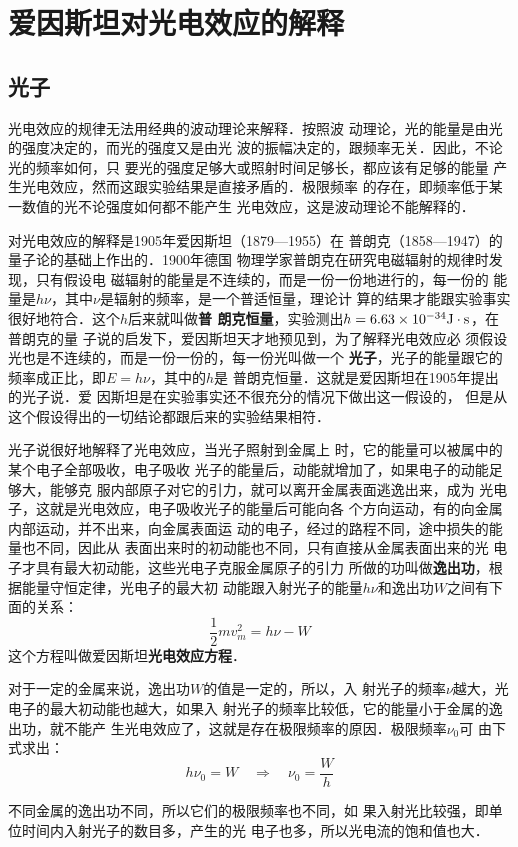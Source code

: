 \section{爱因斯坦对光电效应的解释}
\subsection{光子}
光电效应的规律无法用经典的波动理论来解释．按照波
动理论，光的能量是由光的强度决定的，而光的强度又是由光
波的振幅决定的，跟频率无关．因此，不论光的频率如何，只
要光的强度足够大或照射时间足够长，都应该有足够的能量
产生光电效应，然而这跟实验结果是直接矛盾的．极限频率
的存在，即频率低于某一数值的光不论强度如何都不能产生
光电效应，这是波动理论不能解释的．

对光电效应的解释是1905年爱因斯坦（1879—1955）在
普朗克（1858—1947）的量子论的基础上作出的．1900年德国
物理学家普朗克在研究电磁辐射的规律时发现，只有假设电
磁辐射的能量是不连续的，而是一份一份地进行的，每一份的
能量是$h\nu$，其中$\nu$是辐射的频率，是一个普适恒量，理论计
算的结果才能跟实验事实很好地符合．这个$h$后来就叫做\textbf{普
朗克恒量}，实验测出$h=6.63\times10^{-34}{\rm J}\cdot {\rm s}$，在普朗克的量
子说的启发下，爱因斯坦天才地预见到，为了解释光电效应必
须假设光也是不连续的，而是一份一份的，每一份光叫做一个
\textbf{光子}，光子的能量跟它的频率成正比，即$E=h\nu$，其中的$h$是
普朗克恒量．这就是爱因斯坦在1905年提出的光子说．爱
因斯坦是在实验事实还不很充分的情况下做出这一假设的，
但是从这个假设得出的一切结论都跟后来的实验结果相符．

光子说很好地解释了光电效应，当光子照射到金属上
时，它的能量可以被属中的某个电子全部吸收，电子吸收
光子的能量后，动能就增加了，如果电子的动能足够大，能够克
服内部原子对它的引力，就可以离开金属表面逃逸出来，成为
光电子，这就是光电效应，电子吸收光子的能量后可能向各
个方向运动，有的向金属内部运动，并不出来，向金属表面运
动的电子，经过的路程不同，途中损失的能量也不同，因此从
表面出来时的初动能也不同，只有直接从金属表面出来的光
电子才具有最大初动能，这些光电子克服金属原子的引力
所做的功叫做\textbf{逸出功}，根据能量守恒定律，光电子的最大初
动能跟入射光子的能量$h\nu$和逸出功$W$之间有下面的关系：
\[\frac{1}{2}mv^2_m=h\nu-W \]
这个方程叫做爱因斯坦\textbf{光电效应方程}．

对于一定的金属来说，逸出功$W$的值是一定的，所以，入
射光子的频率$\nu$越大，光电子的最大初动能也越大，如果入
射光子的频率比较低，它的能量小于金属的逸出功，就不能产
生光电效应了，这就是存在极限频率的原因．极限频率$\nu_0$可
由下式求出：
\[h\nu_0=W\quad \Rightarrow\quad \nu_0=\frac{W}{h} \]

不同金属的逸出功不同，所以它们的极限频率也不同，如
果入射光比较强，即单位时间内入射光子的数目多，产生的光
电子也多，所以光电流的饱和值也大．

